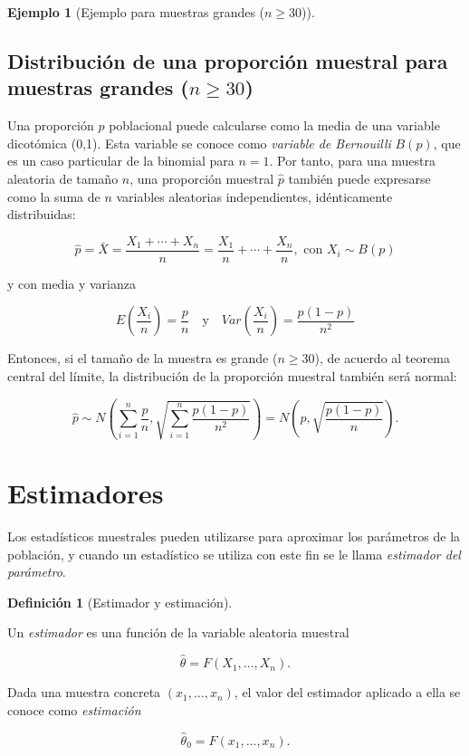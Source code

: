 \documentclass[
  a4paper,
]{scrreport}
\theoremstyle{definition}
\newtheorem{definition}{Definición}[chapter]
\theoremstyle{definition}
\newtheorem{example}{Ejemplo}[chapter]
\theoremstyle{plain}
\theoremstyle{remark}
\begin{document}
\begin{example}[Ejemplo para muestras grandes
(\(n\geq 30\))]
\begin{figure}
{}

\end{figure}

\end{example}

\hypertarget{distribuciuxf3n-de-una-proporciuxf3n-muestral-para-muestras-grandes-ngeq-30}{%
\subsection{\texorpdfstring{Distribución de una proporción muestral para
muestras grandes
(\(n\geq 30\))}{Distribución de una proporción muestral para muestras grandes (n\textbackslash geq 30)}}\label{distribuciuxf3n-de-una-proporciuxf3n-muestral-para-muestras-grandes-ngeq-30}}

Una proporción \(p\) poblacional puede calcularse como la media de una
variable dicotómica (0,1). Esta variable se conoce como \emph{variable
de Bernouilli} \(B(p)\), que es un caso particular de la binomial para
\(n=1\). Por tanto, para una muestra aleatoria de tamaño \(n\), una
proporción muestral \(\hat p\) también puede expresarse como la suma de
\(n\) variables aleatorias independientes, idénticamente distribuidas:

\[
\hat p = \bar X = \frac{X_1+\cdots+X_n}{n} = \frac{X_1}{n}+\cdots+\frac{X_n}{n}, \mbox{ con } X_i\sim B(p)
\]

y con media y varianza

\[
E\left(\frac{X_i}{n}\right) =\frac{p}{n} \quad  \mbox{y} \quad Var\left(\frac{X_i}{n}\right) = \frac{p(1-p)}{n^2}
\]

Entonces, si el tamaño de la muestra es grande (\(n\geq 30\)), de
acuerdo al teorema central del límite, la distribución de la proporción
muestral también será normal:

\[
\hat p \sim N\left(\sum_{i=1}^n \frac{p}{n},\sqrt{\sum_{i=1}^n \frac{p(1-p)}{n^2}} \right) = N\left(p,\sqrt{\frac{p(1-p)}{n}} \right).
\]

\hypertarget{estimadores}{%
\section{Estimadores}\label{estimadores}}

Los estadísticos muestrales pueden utilizarse para aproximar los
parámetros de la población, y cuando un estadístico se utiliza con este
fin se le llama \emph{estimador del parámetro}.

\begin{definition}[Estimador y
estimación]\protect\hypertarget{def-estimador-estimacion}{}\label{def-estimador-estimacion}

Un \emph{estimador} es una función de la variable aleatoria muestral

\[
\hat \theta = F(X_1,\ldots,X_n).
\]

Dada una muestra concreta \((x_1,\ldots,x_n)\), el valor del estimador
aplicado a ella se conoce como \emph{estimación}

\[
\hat \theta_0 = F(x_1,\ldots,x_n).
\]

\end{definition}
\end{document}
